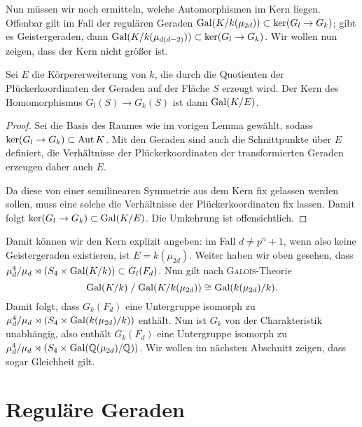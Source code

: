 Nun müssen wir noch ermitteln, welche Automorphismen im Kern liegen. Offenbar gilt im Fall der regulären Geraden $\Gal K/{k(\mu_{2d})} \subset \ker(G_l \to G_k)$; gibt es Geistergeraden, dann $\Gal K/{k(\mu_{d(d-2)})} \subset \ker(G_l \to G_k)$. Wir wollen nun zeigen, dass der Kern nicht größer ist.
\begin{lemma}
Sei $E$ die Körpererweiterung von $k$, die durch die Quotienten der Plückerkoordinaten der Geraden auf der Fläche $S$ erzeugt wird. Der Kern des Homomorphismus $G_l(S) \to G_k(S)$ ist dann $\Gal K/E$.
\end{lemma}
\begin{proof}
Sei die Basis des Raumes wie im vorigen Lemma gewählt, sodass $\ker(G_l \rightarrow G_k) \subset \operatorname{Aut} K$. Mit den Geraden sind auch die Schnittpunkte über $E$ definiert, die Verhältnisse der Plückerkoordinaten der transformierten Geraden erzeugen daher auch $E$.

Da diese von einer semilinearen Symmetrie aus dem Kern fix gelassen werden sollen, muss eine solche die Verhältnisse der Plückerkoordinaten fix lassen. Damit folgt $\ker(G_l \to G_k) \subset \Gal K/E$. Die Umkehrung ist offensichtlich.
\end{proof}

Damit können wir den Kern explizit angeben: im Fall $d \neq p^n+1$, wenn also keine Geistergeraden existieren, ist $E = k(\mu_{2d})$. Weiter haben wir oben gesehen, dass $\mu_d^4 / \mu_d \rtimes (S_4 \times \Gal K/k) \subset G_l(F_d)$. Nun gilt nach \textsc{Galois}-Theorie
\begin{equation}
\Gal K/k \;/\; \Gal K/{k(\mu_{2d})} \cong \Gal k(\mu_{2d})/k.
\end{equation}
Damit folgt, dass $G_k(F_d)$ eine Untergruppe isomorph zu $\mu_d^4 / \mu_d \rtimes (S_4 \times \Gal k(\mu_{2d})/k)$ enthält. Nun ist $G_k$ von der Charakteristik unabhängig, also enthält $G_k(F_d)$ eine Untergruppe isomorph zu $\mu_d^4 / \mu_d \rtimes (S_4 \times \Gal \mathbb Q(\mu_{2d})/{\mathbb Q})$. Wir wollen im nächsten Abschnitt zeigen, dass sogar Gleichheit gilt.

\section{Reguläre Geraden}
